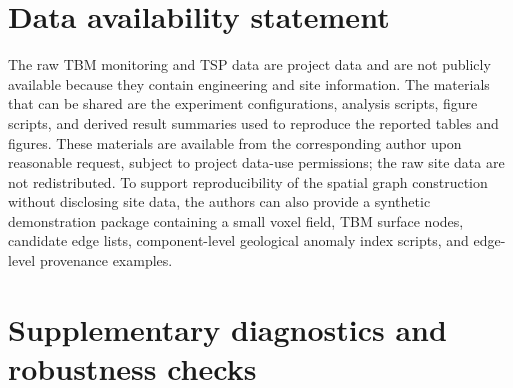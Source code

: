 \documentclass{tGIS2e}
\begin{document}
\section*{Data availability statement}
The raw TBM monitoring and TSP data are project data and are not publicly
available because they contain engineering and site information. The materials
that can be shared are the experiment configurations, analysis scripts, figure
scripts, and derived result summaries used to reproduce the reported tables and
figures. These materials are available from the corresponding author upon
reasonable request, subject to project data-use permissions; the raw site data
are not redistributed. To support reproducibility of the spatial graph construction without disclosing site data, the authors can also provide a synthetic demonstration package containing a small voxel field, TBM surface nodes, candidate edge lists, component-level geological anomaly index scripts, and edge-level provenance examples.




\clearpage
\appendix
\section{Supplementary diagnostics and robustness checks}
\label{app:descriptor_matrix}

\end{document}
